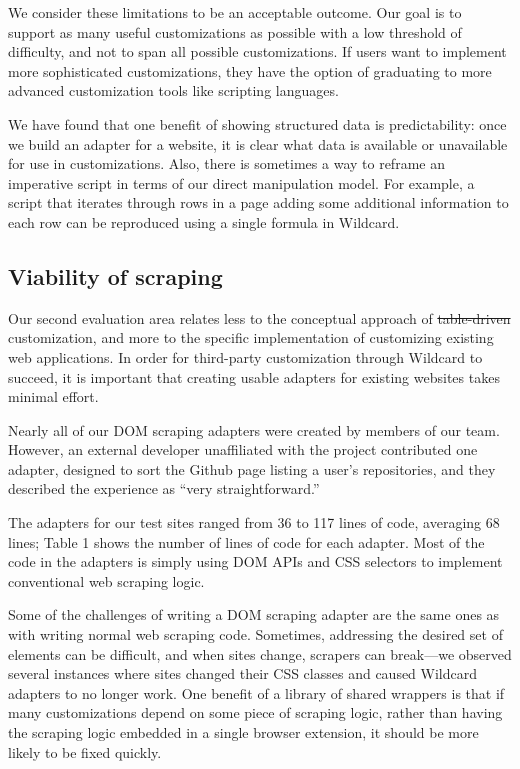 \documentclass[sigplan,screen,10pt,anonymous,review]{acmart}
\providecommand{\DIFadd}[1]{{\protect\color{blue}\uwave{#1}}} %
\providecommand{\DIFdel}[1]{{\protect\color{red}\sout{#1}}}                      %
\providecommand{\DIFaddbegin}{} %
\providecommand{\DIFaddend}{} %
\providecommand{\DIFdelbegin}{} %
\providecommand{\DIFdelend}{} %
\begin{document}
We consider these limitations to be an acceptable outcome. Our goal is
to support as many useful customizations as possible with a low
threshold of difficulty, and not to span all possible customizations. If
users want to implement more sophisticated customizations, they have the
option of graduating to more advanced customization tools like scripting
languages.

We have found that one benefit of showing structured data is
predictability: once we build an adapter for a website, it is clear what
data is available or unavailable for use in customizations. Also, there
is sometimes a way to reframe an imperative script in terms of our
direct manipulation model. For example, a script that iterates through
rows in a page adding some additional information to each row can be
reproduced using a single formula in Wildcard.

\hypertarget{viability-of-scraping}{%
\subsection{Viability of scraping}\label{viability-of-scraping}}

Our second evaluation area relates less to the conceptual approach of
\DIFdelbegin \DIFdel{table-driven }\DIFdelend \DIFaddbegin \DIFadd{data-driven }\DIFaddend customization, and more to the specific implementation of
customizing existing web applications. In order for third-party
customization through Wildcard to succeed, it is important that creating
usable adapters for existing websites takes minimal effort.

Nearly all of our DOM scraping adapters were created by members of our
team. However, an external developer unaffiliated with the project
contributed one adapter, designed to sort the Github page listing a
user's repositories, and they described the experience as ``very
straightforward.''

The adapters for our test sites ranged from 36 to 117 lines of code,
averaging 68 lines; Table 1 shows the number of lines of code for each
adapter. Most of the code in the adapters is simply using DOM APIs and
CSS selectors to implement conventional web scraping logic.

Some of the challenges of writing a DOM scraping adapter are the same
ones as with writing normal web scraping code. Sometimes, addressing the
desired set of elements can be difficult, and when sites change,
scrapers can break---we observed several instances where sites changed
their CSS classes and caused Wildcard adapters to no longer work. One
benefit of a library of shared wrappers is that if many customizations
depend on some piece of scraping logic, rather than having the scraping
logic embedded in a single browser extension, it should be more likely
to be fixed quickly.
\end{document}
